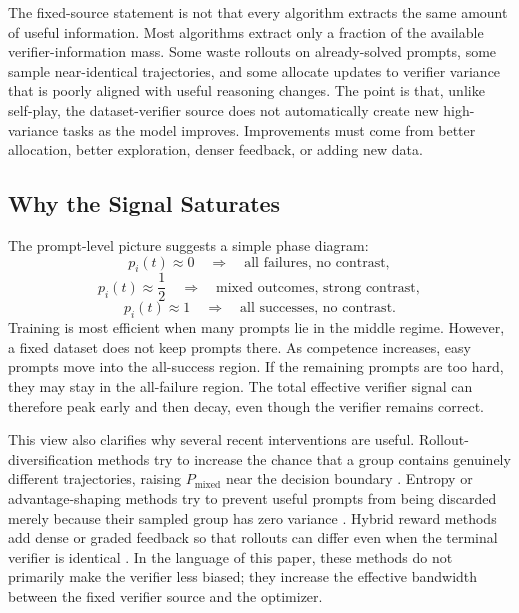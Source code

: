 \begin{discussionbox}[title={Discussion: Fixed does not mean fully used}]
The fixed-source statement is not that every algorithm extracts the same amount of useful information. Most algorithms extract only a fraction of the available verifier-information mass. Some waste rollouts on already-solved prompts, some sample near-identical trajectories, and some allocate updates to verifier variance that is poorly aligned with useful reasoning changes. The point is that, unlike self-play, the dataset-verifier source does not automatically create new high-variance tasks as the model improves. Improvements must come from better allocation, better exploration, denser feedback, or adding new data.
\end{discussionbox}

\subsection{Why the Signal Saturates}

The prompt-level picture suggests a simple phase diagram:
\[
  p_i(t)\approx 0
  \quad\Rightarrow\quad
  \text{all failures, no contrast},
\]
\[
  p_i(t)\approx \frac{1}{2}
  \quad\Rightarrow\quad
  \text{mixed outcomes, strong contrast},
\]
\[
  p_i(t)\approx 1
  \quad\Rightarrow\quad
  \text{all successes, no contrast}.
\]
Training is most efficient when many prompts lie in the middle regime. However, a fixed dataset does not keep prompts there. As competence increases, easy prompts move into the all-success region. If the remaining prompts are too hard, they may stay in the all-failure region. The total effective verifier signal can therefore peak early and then decay, even though the verifier remains correct.

This view also clarifies why several recent \rlvr{} interventions are useful. Rollout-diversification methods try to increase the chance that a group contains genuinely different trajectories, raising $P_{\mathrm{mixed}}$ near the decision boundary \cite{lookahead_rollouts_2026,eepo_2026}. Entropy or advantage-shaping methods try to prevent useful prompts from being discarded merely because their sampled group has zero variance \cite{exploration_exploitation_rlvr_2026,no_prompt_left_behind_2026}. Hybrid reward methods add dense or graded feedback so that rollouts can differ even when the terminal verifier is identical \cite{hybrid_reinforcement_2026}. In the language of this paper, these methods do not primarily make the verifier less biased; they increase the effective bandwidth between the fixed verifier source and the optimizer.


